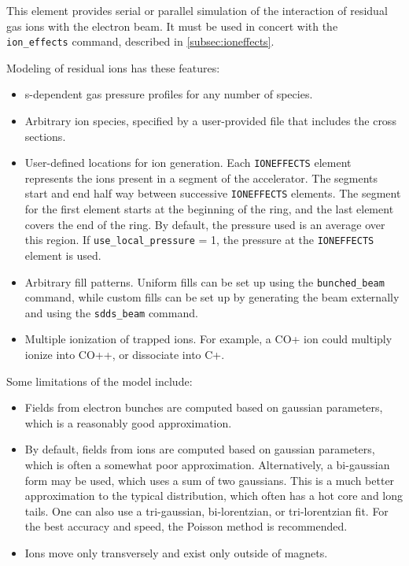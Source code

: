 This element provides serial or parallel simulation of the interaction of residual gas ions
with the electron beam.
It must be used in concert with the \verb|ion_effects| command, described in \ref{subsec:ioneffects}.

Modeling of residual ions has these features:
\begin{itemize}
\item s-dependent gas pressure profiles for any number of species.
\item Arbitrary ion species, specified by a user-provided file that includes the cross sections.
\item User-defined locations for ion generation. Each \verb|IONEFFECTS| element represents the
      ions present in a segment of the accelerator. The segments start and end half way between
      successive \verb|IONEFFECTS| elements.  The segment for the first element starts at the beginning of the ring, and the last element covers the end of the ring.  By default, the pressure used is an average over this region.  If \verb|use_local_pressure| = 1, the pressure at the \verb|IONEFFECTS| element is used.
\item Arbitrary fill patterns. Uniform fills can be set up using the \verb|bunched_beam| command,
      while custom fills can be set up by generating the beam externally and using the \verb|sdds_beam| command.
\item Multiple ionization of trapped ions.  For example, a CO+ ion could multiply ionize into CO++, or dissociate into C+.
\end{itemize}

Some limitations of the model include:
\begin{itemize}
\item Fields from electron bunches are computed based on gaussian parameters, which is a reasonably good
  approximation.
\item By default, fields from ions are computed based on gaussian parameters, which is often a somewhat
  poor approximation. Alternatively, a bi-gaussian form may be used, which uses a sum of two gaussians.
  This is a much better approximation to the typical distribution, which often has a hot core and long tails.  One can also use a tri-gaussian, bi-lorentzian, or tri-lorentzian fit.  For the best accuracy and speed, the Poisson method is recommended.
\item Ions move only transversely and exist only outside of magnets.
\end{itemize}

